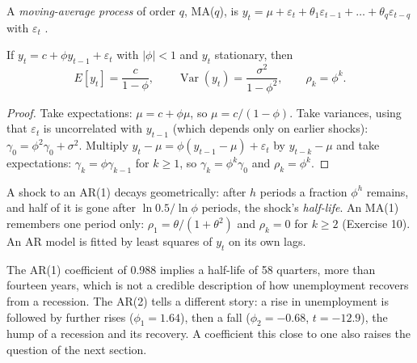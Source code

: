 \begin{definition}\label{def:b2:time-series:ma}
A \emph{moving-average process} of order $q$, MA($q$), is $y_t = \mu + \varepsilon_t +
\theta_1\varepsilon_{t-1} + \dots + \theta_q\varepsilon_{t-q}$ with $\varepsilon_t$ .
\end{definition}

\begin{proposition}[Moments of an AR(1)]\label{prop:b2:time-series:ar1}
If $y_t = c + \phi y_{t-1} + \varepsilon_t$ with $|\phi| < 1$ and $y_t$ stationary, then
\[
E[y_t] = \frac{c}{1 - \phi},\qquad \operatorname{Var}(y_t) = \frac{\sigma^2}{1 - \phi^2},\qquad \rho_k = \phi^k.
\]
\end{proposition}

\begin{proof}
Take expectations: $\mu = c + \phi\mu$, so $\mu = c/(1 - \phi)$. Take variances, using that $\varepsilon_t$ is
uncorrelated with $y_{t-1}$ (which depends only on earlier shocks): $\gamma_0 = \phi^2\gamma_0 + \sigma^2$. Multiply $y_t
- \mu = \phi(y_{t-1} - \mu) + \varepsilon_t$ by $y_{t-k} - \mu$ and take expectations: $\gamma_k = \phi\gamma_{k-1}$ for $k
\ge 1$, so $\gamma_k = \phi^k\gamma_0$ and $\rho_k = \phi^k$.
\end{proof}

A shock to an AR(1) decays geometrically: after $h$ periods a fraction $\phi^h$ remains, and half of it is gone after
$\ln 0.5/\ln\phi$ periods, the shock's \emph{half-life}. An MA(1) remembers one period only: $\rho_1 = \theta/(1 +
\theta^2)$ and $\rho_k = 0$ for $k \ge 2$ (Exercise 10). An AR model is fitted by least squares of $y_t$ on its own lags.

\label{lst:b2:time-series:ar-fit}

\label{out:b2:time-series:ar-fit}

The AR(1) coefficient of 0.988 implies a half-life of 58 quarters, more than fourteen years, which is not a credible
description of how unemployment recovers from a recession. The AR(2) tells a different story: a rise in unemployment is
followed by further rises ($\phi_1 = 1.64$), then a fall ($\phi_2 = -0.68$, $t = -12.9$), the hump of a recession and its
recovery. A coefficient this close to one also raises the question of the next section.


